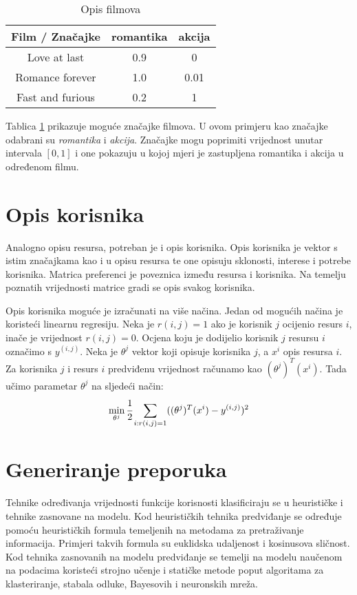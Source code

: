 \documentclass[times, utf8, seminar]{fer}
\begin{document}
\begin{table}[htb]
	\caption{Opis filmova}
	\label{tbl:item_profiles}
	\centering
		\begin{tabular}{|c|c|c|} 
		\hline
		 Film / Značajke & romantika & akcija \\ 
		\hline
		Love at last & 0.9 & 0  \\
		Romance forever & 1.0 & 0.01  \\
		Fast and furious & 0.2 & 1  \\ 
		\hline
		\end{tabular}
\end{table}

Tablica \ref{tbl:item_profiles} prikazuje moguće značajke filmova. U ovom primjeru kao značajke odabrani su \textit{romantika} i \textit{akcija}. Značajke mogu poprimiti vrijednost unutar intervala $[0, 1]$ i one pokazuju u kojoj mjeri je zastupljena romantika i akcija u određenom filmu.

\section{Opis korisnika}
Analogno opisu resursa, potreban je i opis korisnika. Opis korisnika je vektor s istim značajkama kao i u opisu resursa te one opisuju sklonosti, interese i potrebe korisnika. Matrica preferenci je poveznica između resursa i korisnika. Na temelju poznatih vrijednosti matrice gradi se opis svakog korisnika.

Opis korisnika moguće je izračunati na više načina. Jedan od mogućih načina je koristeći linearnu regresiju. Neka je $r(i,j)=1$ ako je korisnik $j$ ocijenio resurs $i$, inače je vrijednost $r(i,j)=0$. Ocjena koju je dodijelio korisnik $j$ resursu $i$ označimo s $y^{(i,j)}$. Neka je $\theta ^j$ vektor koji opisuje korisnika $j$, a $x^i$ opis resursa $i$. Za korisnika $j$ i resurs $i$ predviđenu vrijednost računamo kao $(\theta ^j)^T(x^i)$. Tada učimo parametar $\theta ^j$ na sljedeći način: 
	\begin{equation}
		\min_{\theta ^j} \cfrac{1}{2} \sum_{i:r(i,j)=1} ((\theta ^j)^T(x^i) - y^{(i,j)})^2
	\end{equation}

\section{Generiranje preporuka}
Tehnike određivanja vrijednosti funkcije korisnosti klasificiraju se u heurističke i tehnike zasnovane na modelu. Kod heurističkih tehnika predviđanje se određuje pomoću heurističkih formula temeljenih na metodama za pretraživanje informacija. Primjeri takvih formula su euklidska udaljenost i kosinusova sličnost. Kod tehnika zasnovanih na modelu predviđanje se temelji na modelu naučenom na podacima koristeći strojno učenje i statičke metode poput algoritama za klasteriranje, stabala odluke, Bayesovih i neuronskih mreža.
\end{document}

